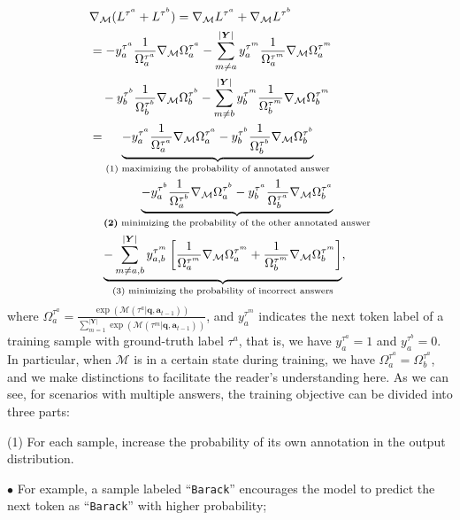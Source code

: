 \begin{equation}
\begin{aligned}
 & \nabla_{\mathcal{M}} (L^{\tau^a} + L^{\tau^b}) = \nabla_{\mathcal{M}} L^{\tau^a} + \nabla_{\mathcal{M}} L^{\tau^b} \\
&= -y_a^{\tau^a}\frac{1}{\Omega_a^{\tau^a}}\nabla_{\mathcal{M}}\Omega_a^{\tau^a}-\sum_{m \neq a}^{|\bm{Y}|} y_a^{\tau^m}\frac{1}{\Omega_a^{\tau^m}}\nabla_{\mathcal{M}}\Omega_a^{\tau^m}
\\
&\quad -y_b^{\tau^b}\frac{1}{\Omega_b^{\tau^b}}\nabla_{\mathcal{M}}\Omega_b^{\tau^b}-\sum_{m \neq b}^{|\bm{Y}|} y_b^{\tau^m}\frac{1}{\Omega_b^{\tau^m}}\nabla_{\mathcal{M}}\Omega_b^{\tau^m}
\\
&= \underbrace{-y_a^{\tau^a}\frac{1}{\Omega_a^{\tau^a}}\nabla_{\mathcal{M}}\Omega_a^{\tau^a}-y_b^{\tau^b}\frac{1}{\Omega_b^{\tau^b}}\nabla_{\mathcal{M}}\Omega_b^{\tau^b}}_{\text{(1) maximizing the probability of annotated answer}}\\& \quad \underbrace{-y_a^{\tau^b}\frac{1}{\Omega_a^{\tau^b}}\nabla_{\mathcal{M}}\Omega_a^{\tau^b}-y_b^{\tau^a}\frac{1}{\Omega_b^{\tau^a}}\nabla_{\mathcal{M}}\Omega_b^{\tau^a}}_{{\text{\textbf{(2)} minimizing the probability of the other annotated answer}}}\\& \quad \underbrace{-\sum_{m \neq a,b}^{|\bm{Y}|}y_{a,b}^{\tau^m} \left[ \frac{1}{\Omega_a^{\tau^m}}\nabla_{\mathcal{M}}\Omega_a^{\tau^m} + \frac{1}{\Omega_b^{\tau^m}}\nabla_{\mathcal{M}}\Omega_b^{\tau^m} \right]}_{\text{(3) minimizing the probability of incorrect answers}},
\end{aligned}
\end{equation}
where $\Omega_a^{\tau^a}=\frac{\exp(\mathcal{M}(\tau^a|\bm{q},\bm{a}_{t-1}))}{\sum_{m=1}^{|\bm{Y}|} \exp(\mathcal{M}(\tau^{m}|\bm{q},\bm{a}_{t-1}))}$, and $y_a^{\tau^m}$ indicates the next token label of a training sample with ground-truth label ${\tau^a}$, that is, we have $y_a^{\tau^a}=1$ and $y_a^{\tau^b}=0$. In particular, when $\mathcal{M}$ is in a certain state during training, we have $\Omega_a^{\tau^a}=\Omega_b^{\tau^a}$, and we make distinctions to facilitate the reader's understanding here. As we can see, for scenarios with multiple answers, the training objective can be divided into three parts:

(1) For each sample, increase the probability of its own annotation in the output distribution. 

$\bullet$ For example, a sample labeled ``\texttt{Barack}'' encourages the model to predict the next token as ``\texttt{Barack}'' with higher probability;

